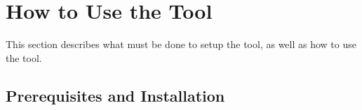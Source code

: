 \documentclass{article}
\begin{document}
\section{How to Use the Tool}
This section describes what must be done to setup the tool, as well as how to use the tool.

\subsection{Prerequisites and Installation}
\end{document}
